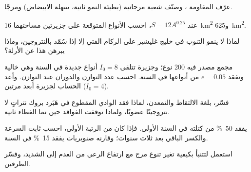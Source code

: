 \begin{exercise}[$\star$]\label{exo:b1:ecosystem-dynamics:3}
عرّف المقاومة ، وصنّف شعبة مرجانية (بطيئة
النمو ثانية، سهلة الابيضاض) ومرجًا.
\end{exercise}

\begin{exercise}[$\star$]\label{exo:b1:ecosystem-dynamics:4}
عند $S = 12 A^{0.25}$، احسب الأنواع المتوقعة على جزيرتين مساحتهما
\qty{16}{km^2} و\qty{625}{km^2}.
\end{exercise}

\begin{exercise}[$\star\star$]\label{exo:b1:ecosystem-dynamics:5}
لماذا لا ينمو التنوب في خليج غليشير على الركام الفتي إلا إذا
سُمّد بالنتروجين، وماذا يبرهن هذا عن الأرلة؟
\end{exercise}

\begin{exercise}[$\star\star$]\label{exo:b1:ecosystem-dynamics:6}
مجمع مصدر فيه 200 نوع؛ وجزيرة تتلقى $I_0 = 8$ أنواع
جديدة في السنة وهي خالية وتفقد $e = 0.05$ من أنواعها في السنة.
احسب عدد التوازن والدوران عند التوازن.
وأعد الحساب لجزيرة أبعد مرتين ($I_0 = 4$).
\end{exercise}

\begin{exercise}[$\star\star$]\label{exo:b1:ecosystem-dynamics:7}
فسّر، بلغة الالتقاط والتمعدن، لماذا فقد الوادي المقطوع
في هَبَرد بروك نتراتٍ لا نتروجينًا عضويًا،
ولماذا توقفت الفواقد حين نما الغطاء ثانية.
\end{exercise}

\begin{exercise}[$\star\star$]\label{exo:b1:ecosystem-dynamics:8}
  يفقد \qty{50}{\%} من كتلته في السنة الأولى. فإذا كان
 من الرتبة الأولى، احسب ثابت السرعة والكسر
الباقي بعد ثلاث سنوات؛ وقارنه  صنوبريات يفقد
\qty{15}{\%} في السنة.
\end{exercise}

\begin{exercise}[$\star\star$]\label{exo:b1:ecosystem-dynamics:9}
استعمل  لتتنبأ بكيفية تغير
تنوع مرج مع ارتفاع الرعي من العدم إلى
الشديد، وفسّر الطرفين.
\end{exercise}

